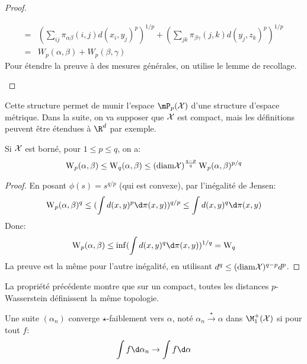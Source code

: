 \begin{proof}
\begin{description}
\begin{align*}
			      =                          & \left(\sum_{ij}\pi_{\alpha\beta}(i, j)d\left(x_{i}, y_{j}\right)^{p}\right)^{1/p} + \left(\sum_{jk}\pi_{\beta\gamma}(j, k)d\left(y_{j}, z_{k}\right)^{p}\right)^{1/p} \\
			      =                          & W_{p}(\alpha, \beta) + W_{p}(\beta, \gamma)
		      \end{align*}
		      Pour étendre la preuve à des mesures générales, on utilise le lemme de recollage.
	\end{description}
\end{proof}

Cette structure permet de munir l'espace $\mP_{p}(\X)$ d'une structure d'espace métrique.
Dans la suite, on va supposer que $\mathcal{X}$ est compact, mais les définitions peuvent être étendues à $\R^{d}$ par exemple.

\begin{proposition}
	Si $\mathcal{X}$ est borné, pour $1\leq p \leq q$, on a:
	\begin{equation*}
		\operatorname{W}_{p}(\alpha, \beta) \leq \operatorname{W}_{q}(\alpha, \beta)\leq (\mathrm{diam } \mathcal{X})^{\frac{q -p}{q}}\operatorname{W}_{p}(\alpha, \beta)^{p/q}
	\end{equation*}
\end{proposition}
\begin{proof}
	En posant $\phi(s) = s^{q/p}$ (qui est convexe), par l'inégalité de Jensen:
	\begin{equation*}
		\Wass_{p}(\alpha, \beta)^{q} \leq (\int d(x, y)^{p}\d \pi(x, y))^{q / p} \leq \int d(x, y)^{q}\d \pi(x, y)
	\end{equation*}
	Donc:
	\begin{equation*}
		\Wass_{p}(\alpha, \beta) \leq \inf (\int d(x, y)^{q}\d\pi(x, y))^{1/q} = \Wass_{q}
	\end{equation*}
	La preuve est la même pour l'autre inégalité, en utilisant $d^{q} \leq (\mathrm{diam }\mathcal{X})^{q - p}d^{p}$.
\end{proof}

\begin{remarque}
	La propriété précédente montre que sur un compact, toutes les distances $p$-Wasserstein définissent la même topologie.
\end{remarque}

\begin{definition}
	Une suite $(\alpha_{n})$ converge $\star$-faiblement vers $\alpha$, noté $\alpha_{n}\xrightarrow{\star}\alpha$ dans $\M_{1}^{+}(\X)$ si pour tout $f$:
	\begin{equation*}
		\int f\d\alpha_{n} \to \int f \d\alpha
	\end{equation*}
\end{definition}

